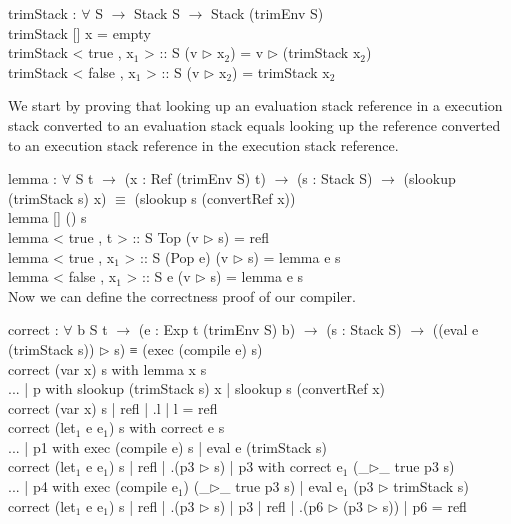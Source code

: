 \documentclass[paper=a4, fontsize=11pt]{scrartcl} %
\numberwithin{equation}{section} %
\numberwithin{figure}{section} %
\numberwithin{table}{section} %
\begin{document}
trimStack : $\forall$ {S} $\rightarrow$ Stack S $\rightarrow$ Stack (trimEnv S)\\
trimStack {[]} x = empty\\
trimStack {< true , x$_1$ > :: S} (v $\rhd$ x$_2$) = v $\rhd$ (trimStack x$_2$)\\
trimStack {< false , x$_1$ > :: S} (v $\rhd$ x$_2$) = trimStack x$_2$\\

\normalfont

We start by proving that looking up an evaluation stack reference in a execution stack converted to an evaluation stack equals looking up the reference converted to an execution stack reference in the execution stack reference.\\
\ttfamily

lemma : $\forall$ {S t} $\rightarrow$ (x : Ref (trimEnv S) t) $\rightarrow$ (s : Stack S) $\rightarrow$ (slookup (trimStack s) x) $\equiv$ (slookup s (convertRef x))\\
lemma {[]} () s\\
lemma {< true , t > :: S} Top (v $\rhd$ s) = refl\\
lemma {< true , x$_1$ > :: S} (Pop e) (v $\rhd$ s) = lemma e s\\
lemma {< false , x$_1$ > :: S} e (v $\rhd$ s) = lemma e s\\

\normalfont
Now we can define the correctness proof of our compiler.
\ttfamily

correct : $\forall$ {b S t} $\rightarrow$ (e : Exp t (trimEnv S) b) $\rightarrow$ (s : Stack S) $\rightarrow$ ((eval e (trimStack s)) $\rhd$ s) ≡ (exec (compile e) s)\\
correct (var x) s with lemma x s\\
... | p with slookup (trimStack s) x | slookup s (convertRef x) \\
correct (var x) s | refl | .l | l = refl\\
correct (let$_1$ e e$_1$) s with correct e s\\
... | p1 with exec (compile e) s | eval e (trimStack s)\\
correct (let$_1$ e e$_1$) s | refl | .(p3 $\rhd$ s) | p3 with correct e$_1$ (\_$\rhd$\_ {true} p3 s)\\
... | p4 with exec (compile e$_1$) (\_$\rhd$\_ {true} p3 s) | eval e$_1$ (p3 $\rhd$ trimStack s)\\
correct (let$_1$ e e$_1$) s | refl | .(p3 $\rhd$ s) | p3 | refl | .(p6 $\rhd$ (p3 $\rhd$ s)) | p6 = refl\\
\normalfont
\end{document}
